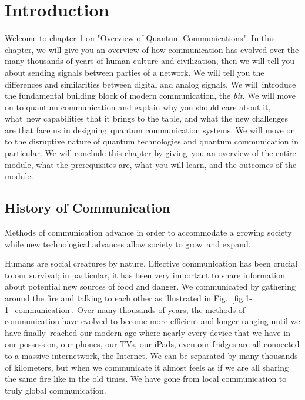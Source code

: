 \chapter[Introduction]{Introduction}
\label{sec:1_Introduction}




Welcome to chapter 1 on "Overview of Quantum Communications".
In this chapter, we will give you an overview of how communication has evolved over the many thousands of years of human culture and civilization, 
then we will tell you about sending signals between parties of a network.
We will tell you the differences and similarities between digital and analog signals.
We will introduce the fundamental building block of modern communication, the \emph{bit}.
We will move on to quantum communication and explain why you should care about it, what new capabilities that it brings to the table, and what the new challenges are that face us in designing quantum communication systems. 
We will move on to the disruptive nature of quantum technologies and quantum communication in particular.
We will conclude this chapter by giving you an overview of the entire module, what the prerequisites are, what you will learn, and the outcomes of the module.


\section{History of Communication}

Methods of communication advance in order to accommodate a growing society while new technological advances allow society to grow and expand.

Humans are social creatures by nature.
Effective communication has been crucial to our survival;
in particular, it has been very important to share information about potential new sources of food and danger.
We communicated by gathering around the fire and talking to each other as illustrated in Fig.~\ref{fig:1-1_communication}.
Over many thousands of years, the methods of communication have evolved to become more efficient and longer ranging until we have finally reached our modern age where nearly every device that we have in our possession, our phones, our TVs, our iPads, even our fridges are all connected to a massive internetwork, the Internet.
We can be separated by many thousands of kilometers, but when we communicate it almost feels as if we are all sharing the same fire like in the old times.
We have gone from local communication to truly global communication.


